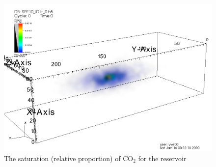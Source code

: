 \documentclass{acm_proc_article-sp}
\newcommand{\jhanote}[1]{ {\textcolor{red} { ***Jha: #1 }}}
\newcommand{\jhanote}[1]{}
\begin{document}
% 
% 

% 
% 



\begin{figure}
\begin{center}
\includegraphics[scale=0.2]{figures/visit0001.png} 
\end{center}
\caption[Simulation Output]{The saturation (relative proportion) of
  CO$_2$ for the reservoir}
\label{fig:saturation}
\end{figure}
\end{document}
